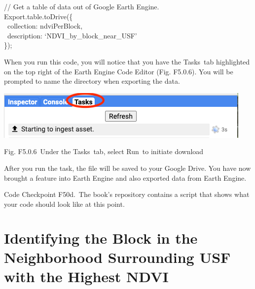 \documentclass[
  letterpaper,
  DIV=11,
  numbers=noendperiod]{scrreprt}
\begin{document}
// Get a table of data out of Google Earth Engine.\\
Export.table.toDrive(\{\\
\hspace*{0.333em} ~collection: ndviPerBlock,\\
\hspace*{0.333em} ~description: `NDVI\_by\_block\_near\_USF'\\
\});

When you run this code, you will notice that you have the Tasks~tab
highlighted on the top right of the Earth Engine Code Editor (Fig.
F5.0.6). You will be prompted to name the directory when exporting the
data.

\includegraphics{./F5/image4.png}

Fig. F5.0.6~Under the Tasks~tab, select Run~to initiate download

After you run the task, the file will be saved to your Google Drive. You
have now brought a feature into Earth Engine and also exported data from
Earth Engine.

\begin{tcolorbox}[enhanced jigsaw, left=2mm, breakable, rightrule=.15mm, opacityback=0, colframe=quarto-callout-note-color-frame, colbacktitle=quarto-callout-note-color!10!white, arc=.35mm, opacitybacktitle=0.6, toptitle=1mm, colback=white, leftrule=.75mm, title=\textcolor{quarto-callout-note-color}{\faInfo}\hspace{0.5em}{Note}, toprule=.15mm, bottomtitle=1mm, titlerule=0mm, bottomrule=.15mm, coltitle=black]

Code Checkpoint F50d.~The book's repository contains a script that shows
what your code should look like at this point.~

\end{tcolorbox}

\hypertarget{identifying-the-block-in-the-neighborhood-surrounding-usf-with-the-highest-ndvi}{%
\section{Identifying the Block in the Neighborhood Surrounding USF with
the Highest
NDVI}\label{identifying-the-block-in-the-neighborhood-surrounding-usf-with-the-highest-ndvi}}
\end{document}
